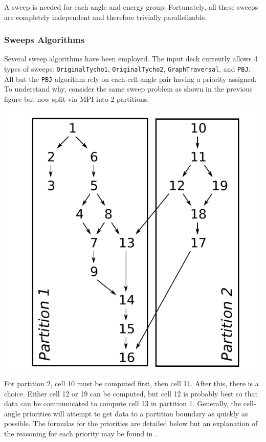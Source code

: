 \documentclass[12pt,letterpaper]{article}
\begin{document}
A sweep is needed for each angle and energy group.
Fortunately, all these sweeps are completely independent and therefore trivially parallelizable.

\subsubsection{Sweeps Algorithms}
Several sweep algorithms have been employed.
The input deck currently allows 4 types of sweeps: {\tt OriginalTycho1}, {\tt OriginalTycho2}, {\tt GraphTraversal}, and {\tt PBJ}.
All but the {\tt PBJ} algorithm rely on each cell-angle pair having a priority assigned.
To understand why, consider the same sweep problem as shown in the previous figure but now split via MPI into 2 partitions.

\includegraphics[scale=0.75]{dag_partitioned.pdf}

For partition 2, cell 10 must be computed first, then cell 11.
After this, there is a choice.
Either cell 12 or 19 can be computed, but cell 12 is probably best so that data can be communicated to compute cell 13 in partition 1.
Generally, the cell-angle priorities will attempt to get data to a partition boundary as quickly as possible.
The formulas for the priorities are detailed below but an explanation of the reasoning for each priority may be found in \cite{pautz-2002}.
\end{document}
